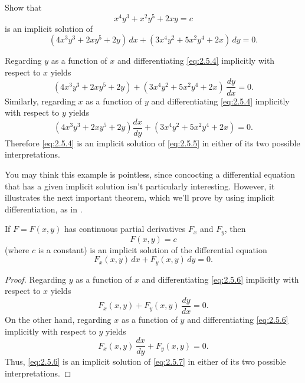 \begin{example}\label{example:2.5.1}
Show that
\begin{equation} \label{eq:2.5.4}
x^4y^3+x^2y^5+2xy=c
\end{equation}
is an implicit solution of
\begin{equation} \label{eq:2.5.5}
(4x^3y^3+2xy^5+2y)\,dx+(3x^4y^2+5x^2y^4+2x)\,dy=0.
\end{equation}
\end{example}

\begin{solution}
Regarding $y$ as a function of $x$ and
differentiating \eqref{eq:2.5.4} implicitly with respect to
$x$ yields
\[
(4x^3y^3+2xy^5+2y)+(3x^4y^2+5x^2y^4+2x)\,\frac{dy}{dx}=0.
\]
Similarly, regarding $x$ as a function of $y$ and
differentiating \eqref{eq:2.5.4} implicitly with respect to
$y$ yields
\[
(4x^3y^3+2xy^5+2y)\frac{dx}{dy}+(3x^4y^2+5x^2y^4+2x)=0.
\]
Therefore \eqref{eq:2.5.4} is an implicit solution of \eqref{eq:2.5.5}
in either of its two possible interpretations.
\end{solution}

You may think this example is pointless, since
concocting a differential equation that has a given implicit solution
isn't particularly interesting. However, it illustrates the
next important theorem, which  we'll prove by using implicit
differentiation,  as  in  .

\begin{theorem}\label{thmtype:2.5.1}
If $F=F(x,y)$ has continuous partial derivatives
$F_x$ and $F_y$, then
\begin{equation} \label{eq:2.5.6}
F(x,y)=c
\end{equation}
(where $c$ is a constant) is an implicit solution of the differential equation
\begin{equation} \label{eq:2.5.7}
F_x(x,y)\,dx+F_y(x,y)\,dy=0.
\end{equation}
\end{theorem}

\begin{proof}
Regarding $y$ as a function of $x$ and  differentiating
\eqref{eq:2.5.6}  implicitly with respect to $x$ yields
\[
F_x(x,y)+F_y(x,y)\,\frac{dy}{dx}=0.
\]
On the other hand,
 regarding $x$ as a function of $y$ and  differentiating
\eqref{eq:2.5.6}  implicitly with respect to $y$ yields
\[
F_x(x,y)\,\frac{dx}{dy}+F_y(x,y)=0.
\]
Thus, \eqref{eq:2.5.6} is an
implicit solution of  \eqref{eq:2.5.7} in either of its two possible
interpretations.
\end{proof}

